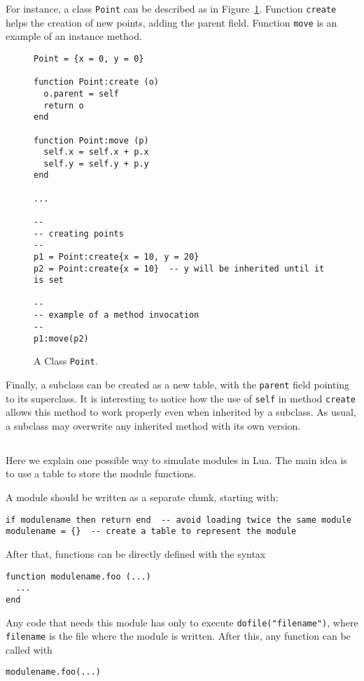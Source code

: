 For instance, a class \verb'Point' can be described as in
Figure~\ref{Point}.
Function \verb'create' helps the creation of new points,
adding the parent field.
Function \verb'move' is an example of an instance method.
\begin{figure}
\Line
\begin{verbatim}
Point = {x = 0, y = 0}

function Point:create (o)
  o.parent = self
  return o
end

function Point:move (p)
  self.x = self.x + p.x
  self.y = self.y + p.y
end

...

--
-- creating points
--
p1 = Point:create{x = 10, y = 20}
p2 = Point:create{x = 10}  -- y will be inherited until it is set

--
-- example of a method invocation
--
p1:move(p2)
\end{verbatim}
\caption{A Class {\tt Point}.\label{Point}}
\Line
\end{figure}
Finally, a subclass can be created as a new table,
with the \verb'parent' field pointing to its superclass.
It is interesting to notice how the use of \verb'self' in
method \verb'create' allows this method to work properly even
when inherited by a subclass.
As usual, a subclass may overwrite any inherited method with
its own version.

\subsection{}
Here we explain one possible way to simulate modules in Lua.
The main idea is to use a table to store the module functions.

A module should be written as a separate chunk, starting with:
\begin{verbatim}
if modulename then return end  -- avoid loading twice the same module
modulename = {}  -- create a table to represent the module
\end{verbatim}
After that, functions can be directly defined with the syntax
\begin{verbatim}
function modulename.foo (...)
  ...
end
\end{verbatim}

Any code that needs this module has only to execute
\verb'dofile("filename")', where \verb'filename' is the file
where the module is written.
After this, any function can be called with
\begin{verbatim}
modulename.foo(...)
\end{verbatim}

